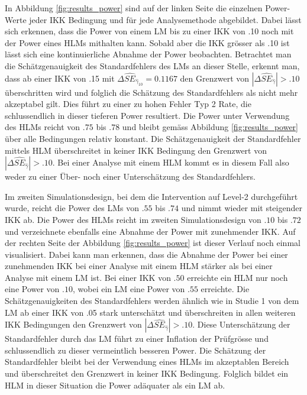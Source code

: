 \documentclass[12pt]{article}\usepackage[]{graphicx}\usepackage[]{color}
\begin{document}
In Abbildung \ref{fig:results_power} sind auf der linken Seite die einzelnen Power-Werte jeder IKK Bedingung und für jede Analysemethode abgebildet. Dabei lässt sich erkennen, dass die Power von einem LM bis zu einer IKK von .10 noch mit der Power eines HLMs mithalten kann. Sobald aber die IKK grösser als .10 ist lässt sich eine kontinuierliche Abnahme der Power beobachten. Betrachtet man die Schätzgenauigkeit des Standardfehlers des LMs an dieser Stelle, erkennt man, dass ab einer IKK von .15 mit $\Delta\widehat{SE}_{\widehat{\gamma}_{10}} = 0.1167$ den Grenzwert von $|\Delta\widehat{SE}_{\widehat{\gamma}}| > .10$ \citep{hooglandboosma1998robustness} überschritten wird und folglich die Schätzung des Standardfehlers als nicht mehr akzeptabel gilt. Dies führt zu einer zu hohen Fehler Typ 2 Rate, die schlussendlich  in dieser tieferen Power resultiert. Die Power unter Verwendung des HLMs reicht von $.75$ bis $.78$ und bleibt gemäss Abbildung \ref{fig:results_power} über alle Bedingungen relativ konstant. Die Schätzgenauigkeit der Standardfehler mittels HLM überschreitet in keiner IKK Bedingung den Grenzwert von $|\Delta\widehat{SE}_{\widehat{\gamma}}| > .10$. Bei einer Analyse mit einem HLM kommt es in diesem Fall also weder zu einer Über- noch einer Unterschätzung des Standardfehlers.

Im zweiten Simulationsdesign, bei dem die Intervention auf Level-2 durchgeführt wurde, reicht die Power des LMs von $.55$ bis $.74$ und nimmt wieder mit steigender IKK ab. Die Power des HLMs reicht im zweiten Simulationsdesign von $.10$ bis $.72$ und verzeichnete ebenfalls eine Abnahme der Power mit zunehmender IKK. Auf der rechten Seite der Abbildung \ref{fig:results_power} ist dieser Verlauf noch einmal visualisiert. Dabei kann man erkennen, dass die Abnahme der Power bei einer zunehmenden IKK bei einer Analyse mit einem HLM stärker als bei einer Analyse mit einem LM ist. Bei einer IKK von $.50$ erreichte ein HLM nur noch eine Power von $.10$, wobei ein LM eine Power von $.55$ erreichte. Die Schätzgenauigkeiten des Standardfehlers werden ähnlich wie in Studie 1 von dem LM ab einer IKK von .05 stark unterschätzt und überschreiten in allen weiteren IKK Bedingungen den Grenzwert von $|\Delta\widehat{SE}_{\widehat{\gamma}}| > .10$. Diese Unterschätzung der Standardfehler durch das LM führt zu einer Inflation der Prüfgrösse und schlussendlich zu dieser vermeintlich besseren Power. Die Schätzung der Standardfehler bleibt bei der Verwendung eines HLMs im akzeptablen Bereich und überschreitet den Grenzwert in keiner IKK Bedingung. Folglich bildet ein HLM in dieser Situation die Power adäquater als ein LM ab.
\end{document}
